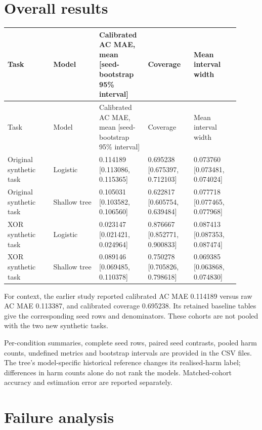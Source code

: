 \documentclass[11pt,a4paper]{article}
\begin{document}
\section{Overall results}

\begingroup\scriptsize
\begin{longtable}{p{0.182\linewidth}p{0.182\linewidth}p{0.182\linewidth}p{0.182\linewidth}p{0.182\linewidth}}
\toprule
Task & Model & Calibrated AC MAE, mean [seed-bootstrap 95\% interval] & Coverage & Mean interval width \\
\midrule
\endfirsthead
\toprule
Task & Model & Calibrated AC MAE, mean [seed-bootstrap 95\% interval] & Coverage & Mean interval width \\
\midrule
\endhead
Original synthetic task & Logistic & 0.114189 [0.113086, 0.115365] & 0.695238 [0.675397, 0.712103] & 0.073760 [0.073481, 0.074024] \\
Original synthetic task & Shallow tree & 0.105031 [0.103582, 0.106560] & 0.622817 [0.605754, 0.639484] & 0.077718 [0.077465, 0.077968] \\
XOR synthetic task & Logistic & 0.023147 [0.021421, 0.024964] & 0.876667 [0.852771, 0.900833] & 0.087413 [0.087353, 0.087474] \\
XOR synthetic task & Shallow tree & 0.089146 [0.069485, 0.110378] & 0.750278 [0.705826, 0.798618] & 0.069385 [0.063868, 0.074830] \\
\bottomrule
\end{longtable}
\endgroup

For context, the earlier study reported calibrated AC MAE 0.114189 versus raw AC MAE 0.113387, and calibrated coverage 0.695238. Its retained baseline tables give the corresponding seed rows and denominators. These cohorts are not pooled with the two new synthetic tasks.\par

Per-condition summaries, complete seed rows, paired seed contrasts, pooled harm counts, undefined metrics and bootstrap intervals are provided in the CSV files. The tree's model-specific historical reference changes its realised-harm label; differences in harm counts alone do not rank the models. Matched-cohort accuracy and estimation error are reported separately.\par

\section{Failure analysis}
\end{document}
